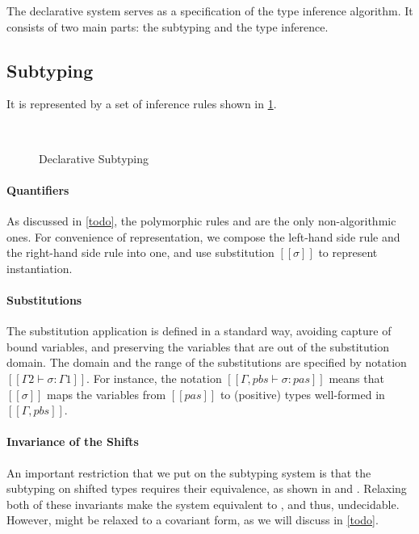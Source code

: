 
The declarative system serves as a specification of the
type inference algorithm. It consists of two main parts:
the subtyping and the type inference. 

\subsection{Subtyping}
It is represented by a set of inference rules shown in
\cref{fig:declarative-subtyping}.

\begin{figure}[h]
  \begin{multicols}{2}
    \ottdefnDOneNsub{}

    \ottdefnDOnePsup{}
  \end{multicols}
  \hfill\\
  \begin{multicols}{2}
    \ottdefnDOneNeq{}

    \ottdefnDOnePeq{}
  \end{multicols}
  \caption{Declarative Subtyping}
  \label{fig:declarative-subtyping}
\end{figure}

\paragraph{Quantifiers} As discussed in \cref{todo}, 
the polymorphic rules  and 
 are the only non-algorithmic ones.
For convenience of representation, we compose the left-hand side rule and
the right-hand side rule into one, and use substitution $[[σ]]$ to 
represent instantiation.  

\paragraph{Substitutions} The substitution application is defined 
in a standard way, avoiding capture of bound variables,
and preserving the variables that are out of the substitution domain.
The domain and the range of the substitutions are
specified by notation $[[Γ2 ⊢ σ : Γ1]]$.
For instance, the notation $[[Γ, pbs ⊢ σ : {pas}]]$ means that 
$[[σ]]$ maps the variables from $[[pas]]$ to (positive) types
well-formed in $[[Γ, pbs]]$.

\paragraph{Invariance of the Shifts}
An important restriction that we put on the subtyping system is
that the subtyping on shifted types requires their equivalence,
as shown in  and
. Relaxing both of these
invariants make the system equivalent to \systemf, 
and thus, undecidable. 
However,  might be
relaxed to a covariant form, as we will discuss in \cref{todo}.

